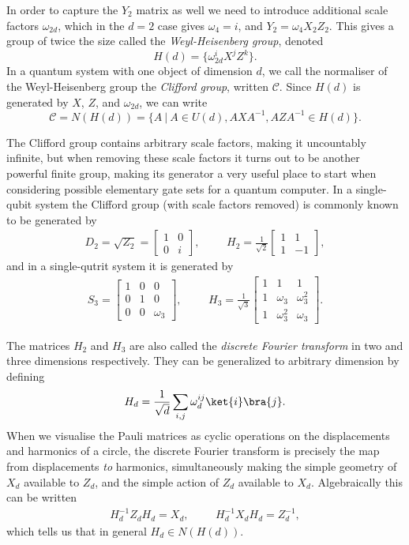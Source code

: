 In order to capture the $Y_2$ matrix as well we need to introduce additional scale factors $\omega_{2d}$, which in the $d=2$ case gives $\omega_4 = i$, and $Y_2 = \omega_{4}X_2Z_2$. This gives a group of twice the size called the \emph{Weyl-Heisenberg group}, denoted
\[H(d) = \{\omega_{2d}^iX^jZ^k\}.\]
In a quantum system with one object of dimension $d$, we call the normaliser of the Weyl-Heisenberg group the \emph{Clifford group}, written $\mathcal{C}$. Since $H(d)$ is generated by $X$, $Z$, and $\omega_{2d}$, we can write
\[\mathcal{C} = N(H(d)) = \{A\ |\ A \in U(d), AXA^{-1}, AZA^{-1} \in H(d)\}.\]

The Clifford group contains arbitrary scale factors, making it uncountably infinite, but when removing these scale factors it turns out to be another powerful finite group, making its generator a very useful place to start when considering possible elementary gate sets for a quantum computer. In a single-qubit system the Clifford group (with scale factors removed) is commonly known to be generated by
\begin{align*}
D_2 = \sqrt{Z_2} = \begin{bmatrix}
1 & 0 \\
0 & i
\end{bmatrix},
&&&
H_2 = \frac{1}{\sqrt{2}}\begin{bmatrix}
1 & 1 \\
1 & -1
\end{bmatrix},
\end{align*}
and in a single-qutrit system it is generated by
\begin{align*}
S_3 = \begin{bmatrix}
1 & 0 & 0 \\
0 & 1 & 0 \\
0 & 0 & \omega_3
\end{bmatrix},
&&&
H_3 = \frac{1}{\sqrt{3}}\begin{bmatrix}
1 & 1 & 1 \\
1 & \omega_3 & \omega_3^2 \\
1 & \omega_3^2 & \omega_3
\end{bmatrix}.
\end{align*}

The matrices $H_2$ and $H_3$ are also called the \emph{discrete Fourier transform} in two and three dimensions respectively. They can be generalized to arbitrary dimension by defining
\[H_d = \frac{1}{\sqrt{d}}\sum_{i,j} \omega_d^{ij}\ket{i}\bra{j}.\]
When we visualise the Pauli matrices as cyclic operations on the displacements and harmonics of a circle, the discrete Fourier transform is precisely the map from displacements \emph{to} harmonics, simultaneously making the simple geometry of $X_d$ available to $Z_d$, and the simple action of $Z_d$ available to $X_d$. Algebraically this can be written
\begin{align*}
H_d^{-1}Z_dH_d = X_d, &&& H_d^{-1}X_dH_d = Z_d^{-1},
\end{align*}
which tells us that in general $H_d \in N(H(d))$.

